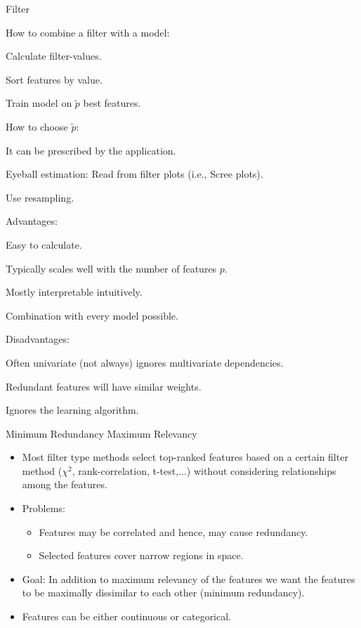 \begin{vbframe}{Filter}
\begin{blocki}{How to combine a filter with a model:}
  \item Calculate filter-values.
  \item Sort features by value.
  \item Train model on $\tilde{p}$ best features.
\end{blocki}

\lz

\begin{blocki}{How to choose $\tilde{p}$:}
  \item It can be prescribed by the application.
  \item Eyeball estimation: Read from filter plots (i.e., Scree plots).
  \item Use resampling.
\end{blocki}

\framebreak

\begin{blocki}{Advantages:}
  \item Easy to calculate.
  \item Typically scales well with the number of features $p$.
  \item Mostly interpretable intuitively.
  \item Combination with every model possible.
\end{blocki}

\begin{blocki}{Disadvantages:}
  \item Often univariate (not always) ignores multivariate dependencies.
  \item Redundant features will have similar weights.
  \item Ignores the learning algorithm.
\end{blocki}
\end{vbframe}

\begin{vbframe}{Minimum Redundancy Maximum Relevancy}
\begin{itemize}
  \item Most filter type methods select top-ranked features based on a certain filter method ($\chi^2$, rank-correlation, t-test,...) without considering relationships among the features.
  \item Problems:
  \begin{itemize}
  \item Features may be correlated and hence, may cause redundancy.
  \item Selected features cover narrow regions in space.
  \end{itemize}
  \item Goal: In addition to maximum relevancy of the features we want the features to be maximally dissimilar to each other (minimum redundancy).
  \item Features can be either continuous or categorical.
\end{itemize}
\end{vbframe}

